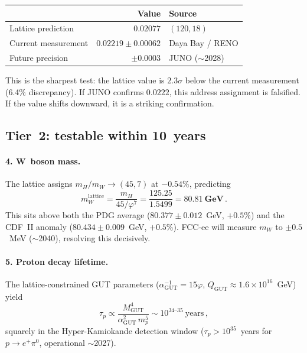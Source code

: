 \documentclass[12pt,a4paper]{article}
\newcommand{\vp}{\varphi}
\newcommand{\aGUT}{\alpha_{\mathrm{GUT}}}
\newcommand{\QGUT}{Q_{\mathrm{GUT}}}
\begin{document}
\begin{table}[H]
\centering
\begin{tabular}{@{}lrl@{}}
\toprule
 & Value & Source \\
\midrule
Lattice prediction    & $0.02077$ & $(120, 18)$ \\
Current measurement   & $0.02219 \pm 0.00062$ & Daya Bay / RENO \\
Future precision      & $\pm 0.0003$ & JUNO ($\sim$2028) \\
\bottomrule
\end{tabular}
\end{table}

This is the sharpest test: the lattice value is $2.3\sigma$ below the current
measurement (6.4\% discrepancy).  If JUNO confirms $0.0222$, this address
assignment is falsified.  If the value shifts downward, it is a striking
confirmation.

\subsection{Tier~2: testable within 10~years}

\paragraph{4. W~boson mass.}
The lattice assigns $m_H/m_W \to (45, 7)$ at $-0.54\%$, predicting
\begin{equation}
  m_W^{\mathrm{lattice}} = \frac{m_H}{45/\vp^7} = \frac{125.25}{1.5499}
  = \mathbf{80.81~\text{GeV}}\,.
\end{equation}
This sits above both the PDG average ($80.377 \pm 0.012$~GeV, $+0.5\%$)
and the CDF~II anomaly ($80.434 \pm 0.009$~GeV, $+0.5\%$).  FCC-ee will
measure $m_W$ to $\pm 0.5$~MeV ($\sim$2040), resolving this decisively.

\paragraph{5. Proton decay lifetime.}
The lattice-constrained GUT parameters ($\aGUT^{-1} = 15\vp$,
$\QGUT \approx 1.6 \times 10^{16}$~GeV) yield
\begin{equation}
  \tau_p \propto \frac{M_{\mathrm{GUT}}^4}{\alpha_{\mathrm{GUT}}^2\, m_p^5}
  \sim 10^{34\text{--}35}~\text{years}\,,
\end{equation}
squarely in the Hyper-Kamiokande detection window
($\tau_p > 10^{35}$~years for $p \to e^+\pi^0$, operational $\sim$2027).
\end{document}
